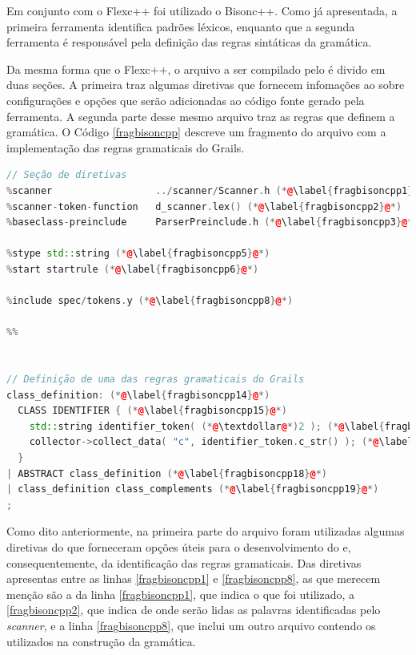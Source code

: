 Em conjunto com o \textsf{Flexc++} foi utilizado o \textsf{Bisonc++}. Como já
apresentada, a primeira ferramenta identifica padrões léxicos, enquanto que a
segunda ferramenta é responsável pela definição das regras sintáticas da
gramática.

Da mesma forma que o \textsf{Flexc++}, o arquivo a ser compilado pelo \bisoncpp é divido
em duas seções. A primeira traz algumas diretivas que fornecem infomações ao
\bisoncpp sobre configurações e opções que serão adicionadas ao código fonte
gerado pela ferramenta. A segunda parte desse mesmo arquivo traz as regras
que definem a gramática. O Código \ref{fragbisoncpp} descreve um fragmento
do arquivo com a implementação das regras gramaticais do \textsf{Grails}.

\begin{lstlisting}[language=C++, label=fragbisoncpp, caption=Fragmento do código fonte para o \bisoncpp]
// Seção de diretivas
%scanner                  ../scanner/Scanner.h (*@\label{fragbisoncpp1}@*)
%scanner-token-function   d_scanner.lex() (*@\label{fragbisoncpp2}@*)
%baseclass-preinclude     ParserPreinclude.h (*@\label{fragbisoncpp3}@*)

%stype std::string (*@\label{fragbisoncpp5}@*)
%start startrule (*@\label{fragbisoncpp6}@*)

%include spec/tokens.y (*@\label{fragbisoncpp8}@*)

%%


// Definição de uma das regras gramaticais do Grails
class_definition: (*@\label{fragbisoncpp14}@*)
  CLASS IDENTIFIER { (*@\label{fragbisoncpp15}@*)
    std::string identifier_token( (*@\textdollar@*)2 ); (*@\label{fragbisoncpp16}@*)
    collector->collect_data( "c", identifier_token.c_str() ); (*@\label{fragbisoncpp17}@*)
  }
| ABSTRACT class_definition (*@\label{fragbisoncpp18}@*)
| class_definition class_complements (*@\label{fragbisoncpp19}@*)
;
\end{lstlisting}

Como dito anteriormente, na primeira parte do arquivo foram utilizadas algumas
diretivas do \bisoncpp que forneceram opções úteis para o desenvolvimento do
\parser e, consequentemente, da identificação das regras gramaticais. Das
diretivas apresentas entre as linhas \ref{fragbisoncpp1} e
\ref{fragbisoncpp8}, as que merecem menção são a da linha
\ref{fragbisoncpp1}, que indica o \scanner que foi utilizado,
a \ref{fragbisoncpp2}, que indica de onde serão lidas as palavras identificadas
pelo \textit{scanner}, e a linha \ref{fragbisoncpp8}, que inclui um outro
arquivo contendo os \tokens utilizados na construção da gramática.

